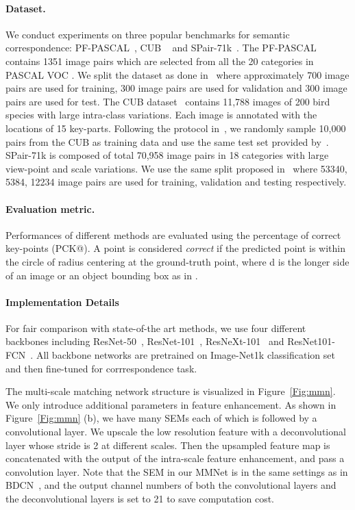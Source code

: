 \paragraph{Dataset.}
We conduct experiments on three popular benchmarks for semantic correspondence: PF-PASCAL~\cite{ham2017proposal}, CUB ~\cite{cub} and SPair-71k~\cite{spair}. The PF-PASCAL contains 1351 image pairs which are selected from all the 20 categories in PASCAL VOC \cite{pascal-voc}. We split the dataset as done in~\cite{han2017scnet} where approximately 700 image pairs are used for training, 300 image pairs are used for validation and 300 image pairs are used for test. The CUB dataset~\cite{cub} contains 11,788 images of 200 bird species with large intra-class variations. Each image is annotated with the locations of 15 key-parts. Following the protocol in~\cite{li2020correspondence}, we randomly sample 10,000 pairs from the CUB as training data and use the same test set provided by~\cite{cub-test}. SPair-71k is composed of total 70,958 image pairs in 18 categories with large view-point and scale variations. We use the same split proposed in~\cite{spair} where 53340, 5384, 12234 image pairs are used for training, validation and testing respectively. 

\paragraph{Evaluation metric.}Performances of different methods are evaluated using the percentage of correct key-points (PCK@). A point is considered \textit{correct} if the predicted point is within the circle of radius  centering at the ground-truth point, where d is the longer side of an image or an object bounding box as in \cite{han2017scnet,Rocco18b,li2020correspondence,liu2020semantic,min2020learning}.

\paragraph{Implementation Details}

For fair comparison with state-of-the art methods, we use four different backbones including ResNet-50~\cite{he2016deep}, ResNet-101~\cite{he2016deep}, ResNeXt-101~\cite{xie2017aggregated} and ResNet101-FCN~\cite{he2016deep}. All backbone networks are pretrained on Image-Net1k classification set~\cite{krizhevsky2012imagenet} and then fine-tuned for corrrespondence task. 

The multi-scale matching network structure is visualized in Figure~\ref{Fig:mmn}. We only introduce additional parameters in feature enhancement. As shown in Figure~\ref{Fig:mmn} (b), we have many SEMs  each of which is followed by a  convolutional layer. We upscale the low resolution feature with a  deconvolutional layer whose stride is 2 at different scales. Then the upsampled feature map is concatenated with the output of the intra-scale feature enhancement, and pass a  convolution layer. Note that the SEM in our MMNet is in the same settings as in BDCN~\cite{he2019bi}, and the output channel numbers of both the convolutional layers and the deconvolutional layers is set to 21 to save computation cost.


